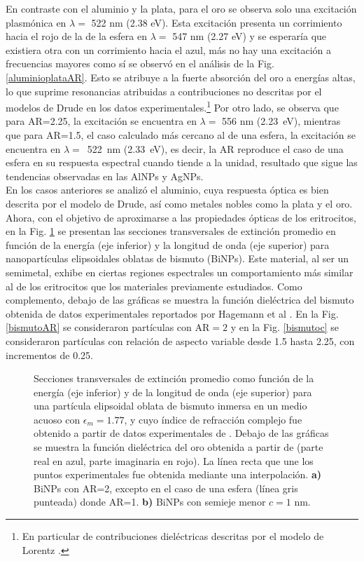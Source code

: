 En contraste con el aluminio y la plata, para el oro se observa solo una excitación plasmónica en $\lambda=$ 522 nm (2.38 eV). Esta excitación presenta un corrimiento hacia el rojo de la de la esfera en $\lambda=$ 547 nm (2.27 eV) y se esperaría que existiera otra con un corrimiento hacia el azul, más no hay una excitación a frecuencias mayores como sí se observó en el análisis de la Fig. \ref{aluminioplataAR}. Esto se atribuye a la fuerte absorción del oro a energías altas, lo que suprime resonancias atribuidas a contribuciones no descritas por el modelos de Drude en los datos experimentales.\footnote{En particular de contribuciones dieléctricas descritas por el modelo de Lorentz \cite{Plasmonics}.} Por otro lado, se observa que para AR=2.25, la excitación se encuentra en $\lambda=$ 556 nm (2.23~eV), mientras que para AR=1.5, el caso calculado más cercano al de una esfera, la excitación se encuentra en $\lambda=$~522~nm (2.33~eV), es decir, la AR reproduce el caso de una esfera en su respuesta espectral cuando tiende a la unidad, resultado que sigue las tendencias observadas en las AlNPs y AgNPs.\\

En los casos anteriores se analizó el aluminio, cuya respuesta óptica es bien descrita por el modelo de Drude, así como metales nobles como la plata y el oro. Ahora, con el objetivo de aproximarse a las propiedades ópticas de los eritrocitos, en la Fig. \ref{bismuto} se presentan las secciones transversales de extinción promedio en función de la energía (eje inferior) y la longitud de onda (eje superior) para nanopartículas elipsoidales oblatas de bismuto (BiNPs). Este material, al ser un semimetal, exhibe en ciertas regiones espectrales un comportamiento más similar al de los eritrocitos que los materiales previamente estudiados. Como complemento, debajo de las gráficas se muestra la función dieléctrica del bismuto obtenida de datos experimentales reportados por Hagemann et al \cite{Bismuto}. En la Fig. \ref{bismutoAR} se consideraron partículas con  AR$=2$  y en la Fig. \ref{bismutoc} se consideraron partículas con relación de aspecto variable desde 1.5 hasta 2.25, con incrementos de 0.25. 

\begin{figure}[H]
	\quad%
	\caption{Secciones transversales de extinción promedio  como función de la energía (eje inferior) y de la longitud de onda (eje superior) para una partícula elipsoidal oblata de bismuto inmersa en un medio acuoso con $\epsilon_m=1.77$, y cuyo índice de refracción complejo fue obtenido a partir de datos experimentales de \cite{Bismuto}. Debajo de las gráficas se muestra la función dieléctrica del oro obtenida a partir de \cite{Plata} (parte real en azul, parte imaginaria en rojo). La línea recta que une los puntos experimentales fue obtenida mediante una interpolación. \textbf{a)} BiNPs con AR=2, excepto en el caso de una esfera (línea gris punteada) donde AR=1. \textbf{b)} BiNPs con semieje menor $c=1$ nm.}\label{bismuto}
\end{figure}


